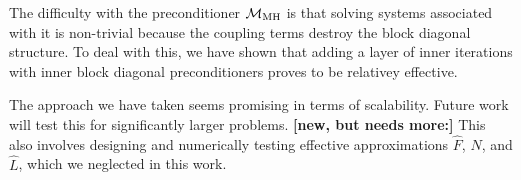 \documentclass{siamltex}
\begin{document}
The difficulty with the preconditioner $\mathcal{M}_{\rm MH}$ is that solving systems associated with it is non-trivial because the coupling terms destroy the block diagonal structure. To deal with this, we have shown that adding a layer of  inner iterations with inner block diagonal preconditioners proves to be relativey effective.

The approach we have taken seems promising in terms of scalability. Future work will test this for significantly larger problems. {\bf [new, but needs more:]} This also involves designing and numerically testing effective approximations $\widehat{F}$, $\widehat{N}$, and $\widehat{L}$,
which we neglected in this work.



\end{document}
